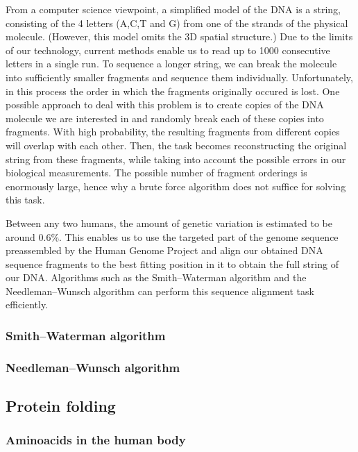 From a computer science viewpoint, a simplified model of the DNA is a string, consisting of the 4 letters (A,C,T and G) from one of the strands of the physical molecule. (However, this model omits the 3D spatial structure.) Due to the limits of our technology, current methods enable us to read up to 1000 consecutive letters in a single run. To sequence a longer string, we can break the molecule into sufficiently smaller fragments and sequence them individually. Unfortunately, in this process the order in which the fragments originally occured is lost. One possible approach to deal with this problem is to create copies of the DNA molecule we are interested in and randomly break each of these copies into fragments. With high probability, the resulting fragments from different copies will overlap with each other. Then, the task becomes reconstructing the original string from these fragments, while taking into account the possible errors in our biological measurements. The possible number of fragment orderings is enormously large, hence why a brute force algorithm does not suffice for solving this task.

Between any two humans, the amount of genetic variation is estimated to be around 0.6\%\cite{the_1000_genomes_project_consortium_global_2015}. This enables us to use the targeted part of the genome sequence preassembled by the Human Genome Project and align our obtained DNA sequence fragments to the best fitting position in it to obtain the full string of our DNA. Algorithms such as the Smith–Waterman algorithm and the Needleman–Wunsch algorithm can perform this sequence alignment task efficiently.

\subsubsection{Smith–Waterman algorithm}

\subsubsection{Needleman–Wunsch algorithm}

\subsection{Protein folding}

\subsubsection{Aminoacids in the human body}

